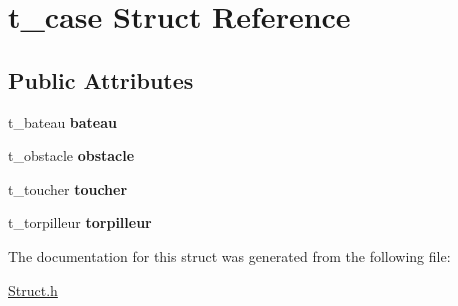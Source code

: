 \hypertarget{structt__case}{}\section{t\+\_\+case Struct Reference}
\label{structt__case}
\subsection*{Public Attributes}
\begin{DoxyCompactItemize}
\item 
\hypertarget{structt__case_ad16c3eadf015cbd5dd99436d3b3d15c8}{}t\+\_\+bateau {\bfseries bateau}\label{structt__case_ad16c3eadf015cbd5dd99436d3b3d15c8}

\item 
\hypertarget{structt__case_a3a9fab29776775d47be67bf1549f8447}{}t\+\_\+obstacle {\bfseries obstacle}\label{structt__case_a3a9fab29776775d47be67bf1549f8447}

\item 
\hypertarget{structt__case_a106416411e214b47d6d88b68baae7c84}{}t\+\_\+toucher {\bfseries toucher}\label{structt__case_a106416411e214b47d6d88b68baae7c84}

\item 
\hypertarget{structt__case_a5638e828cde121bb4ad71f250a42a4f7}{}t\+\_\+torpilleur {\bfseries torpilleur}\label{structt__case_a5638e828cde121bb4ad71f250a42a4f7}

\end{DoxyCompactItemize}


The documentation for this struct was generated from the following file\+:\begin{DoxyCompactItemize}
\item 
\hyperlink{_struct_8h}{Struct.\+h}\end{DoxyCompactItemize}
